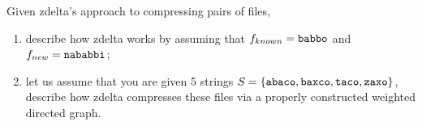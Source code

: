 \exercise

Given zdelta’s approach to compressing pairs of files,
%
\begin{enumerate}

  \item describe how zdelta works by assuming that $f_{known} = \text{\tt
  babbo}$ and $f_{new} = \text{\tt nababbi}$;

  \item let us assume that you are given 5 strings $S = \{ \text{\tt abaco},
  \text{\tt baxco}, \text{\tt taco}, \text{\tt zaxo} \}$, describe how zdelta
  compresses these files via a properly constructed weighted directed graph.

\end{enumerate}

\solution

